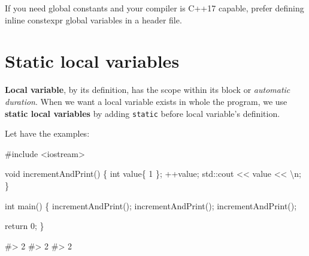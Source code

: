 \documentclass[
  letterpaper,
  DIV=11,
  numbers=noendperiod]{scrreprt}
\newenvironment{Shaded}{\begin{snugshade}}{\end{snugshade}}
\newcommand{\CommentTok}[1]{\textcolor[rgb]{0.37,0.37,0.37}{#1}}
\newcommand{\DecValTok}[1]{\textcolor[rgb]{0.68,0.00,0.00}{#1}}
\newcommand{\ErrorTok}[1]{\textcolor[rgb]{0.68,0.00,0.00}{#1}}
\newcommand{\FunctionTok}[1]{\textcolor[rgb]{0.28,0.35,0.67}{#1}}
\newcommand{\NormalTok}[1]{\textcolor[rgb]{0.00,0.23,0.31}{#1}}
\newcommand{\SpecialCharTok}[1]{\textcolor[rgb]{0.37,0.37,0.37}{#1}}
\newcommand{\StringTok}[1]{\textcolor[rgb]{0.13,0.47,0.30}{#1}}
\begin{document}
\begin{tcolorbox}[enhanced jigsaw, toprule=.15mm, rightrule=.15mm, opacityback=0, breakable, leftrule=.75mm, colback=white, colframe=quarto-callout-tip-color-frame, arc=.35mm, left=2mm, bottomrule=.15mm]
\begin{minipage}[t]{5.5mm}
\textcolor{quarto-callout-tip-color}{\faLightbulb}
\end{minipage}%
\begin{minipage}[t]{\textwidth - 5.5mm}

If you need global constants and your compiler is C++17 capable, prefer
defining inline constexpr global variables in a header file.

\end{minipage}%
\end{tcolorbox}

\hypertarget{static-local-variables}{%
\section{Static local variables}\label{static-local-variables}}

\textbf{Local variable}, by its definition, has the scope within its
block or \emph{automatic duration}. When we want a local variable exists
in whole the program, we use \textbf{static local variables} by adding
\texttt{static} before local variable's definition.

Let have the examples:

\begin{Shaded}
\begin{Highlighting}[]
\CommentTok{\#include \textless{}iostream\textgreater{}}

\NormalTok{void }\FunctionTok{incrementAndPrint}\NormalTok{()}
\NormalTok{\{}
\NormalTok{    int value\{ }\DecValTok{1}\NormalTok{ \};}
    \SpecialCharTok{++}\NormalTok{value;}
\NormalTok{    std}\SpecialCharTok{::}\NormalTok{cout }\SpecialCharTok{\textless{}}\ErrorTok{\textless{}}\NormalTok{ value }\SpecialCharTok{\textless{}}\ErrorTok{\textless{}} \StringTok{\textquotesingle{}}\SpecialCharTok{\textbackslash{}n}\StringTok{\textquotesingle{}}\NormalTok{;}
\NormalTok{\}}

\NormalTok{int }\FunctionTok{main}\NormalTok{()}
\NormalTok{\{}
    \FunctionTok{incrementAndPrint}\NormalTok{();}
    \FunctionTok{incrementAndPrint}\NormalTok{();}
    \FunctionTok{incrementAndPrint}\NormalTok{();}

\NormalTok{    return }\DecValTok{0}\NormalTok{;}
\NormalTok{\}}

\CommentTok{\#\textgreater{} 2}
\CommentTok{\#\textgreater{} 2}
\CommentTok{\#\textgreater{} 2}
\end{Highlighting}
\end{Shaded}
\end{document}
